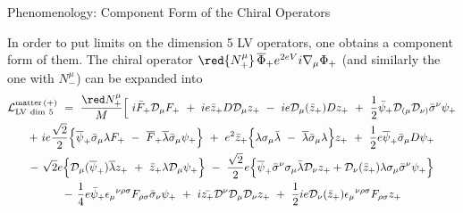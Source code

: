 \documentclass[pdf,PItalk,slideColor,colorBG,accumulate]{prosper}
\begin{document}

{
\begin{slide}[Replace]{ Phenomenology: Component Form of the Chiral Operators }

\vspace{-0.5cm}
	In order to put limits on the dimension 5 LV operators, one
	obtains a component form of them.
	The chiral operator 
$ {\red {N_+^\mu}}\, \overline{\Phi}_+ e^{2eV} i \nabla_\mu \Phi_+ $
	(and similarly the one with {\red $ N_-^\mu $}) 
	can be expanded into
\begin{gather*}
\nonumber
  \mathcal{L}_{\mathrm{LV~dim~5}}^{\mathrm{matter\,(+)}} 
~ =~ \frac{\red N_+^\mu}{M} \Big[~
    i \bar{F}_+ \mathcal{D}_\mu F_+ ~+~
    i e \bar{z}_+ D \mathcal{D}_\mu z_+ ~-~
    i e \mathcal{D}_\mu(\bar{z}_+) D z_+ 
~+~ 
  \frac{1}{2}\bar{\psi}_+\mathcal{D}_{(\mu}\mathcal{D}_{\nu)}
               \bar{\sigma}^\nu \psi_+ 
\nonumber \\
  + ~ 
    i e \frac{\sqrt{2}}{2} \Big\{
               \overline{\psi}_+\bar\sigma_\mu\lambda F_+ 
       ~-~
               \overline{F}_+\overline{\lambda} \bar\sigma_\mu \psi_+
                         \Big\}  ~+~
    e^2 \bar{z}_+ \Big\{
               \lambda\sigma_\mu\bar{\lambda} 
       ~-~
               \overline{\lambda}\bar\sigma_\mu\lambda 
                       \Big\} z_+ 
~+~ 
    \frac{1}{2} e \overline{\psi}_+\bar\sigma_\mu D\psi_+
\nonumber \\
\nonumber
 -~ 
   \sqrt{2} e \Big\{ 
                     \mathcal{D}_\mu(\overline{\psi}_+)\overline{\lambda} z_+ 
     ~+~ 
                     \bar{z}_+ \lambda \mathcal{D}_\mu \psi_+ 
                     \Big\} 
    ~-~ 
    \frac{\sqrt{2}}{2} e \Big\{ 
                      \overline{\psi}_+\bar\sigma^\nu\sigma_\mu 
                     \bar{\lambda}\mathcal{D}_\nu z_+ +
                     \mathcal{D}_\nu(\bar{z}_+)\lambda\sigma_\mu
                     \bar{\sigma}^\nu \psi_+
                     \Big\}
   \\
  ~ -~
  \frac{1}{4} e \bar{\psi}_+\epsilon_\mu{}^{\nu\rho\sigma}
              F_{\rho\sigma} \bar{\sigma}_\nu \psi_+
   ~+~
  i \bar{z_+} \mathcal{D}^\nu \mathcal{D}_\mu \mathcal{D}_\nu z_+ 
   ~+~
   \frac{1}{2} i e \mathcal{D}_\nu (\bar{z}_+) \epsilon_\mu{}^{\nu\rho\sigma}
              F_{\rho\sigma} z_+ \, 

\end{gather*}
\end{slide}}
\end{document}
